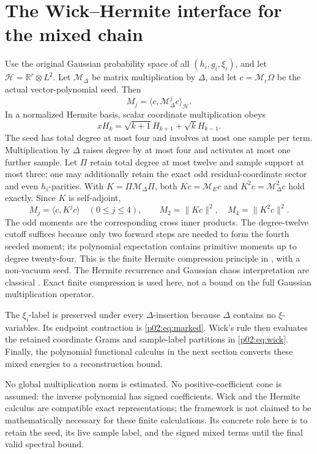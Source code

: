 \documentclass[11pt]{article}
\numberwithin{equation}{section}
\theoremstyle{definition}\newtheorem{definition}[theorem]{Definition}
\theoremstyle{remark}\newtheorem{remark}[theorem]{Remark}
\newcommand{\R}{\mathbb R}\newcommand{\E}{\mathbb E}\newcommand{\Prob}{\mathbb P}
\newcommand{\norm}[1]{\lVert#1\rVert}\newcommand{\ip}[2]{\langle#1,#2\rangle}
\begin{document}
\par{}
\section{The Wick--Hermite interface for the mixed chain}\label{p02:sec:interface}
Use the original Gaussian probability space of all \((h_i,g_i,\xi_i)\), and let \(\mathcal H=\R^r\otimes L^2\). Let \(\mathcal M_\Delta\) be matrix multiplication by \(\Delta\), and let \(c=\mathcal M_c\Omega\) be the actual vector-polynomial seed. Then
\[
 M_j=\langle c,\mathcal M_\Delta^j c\rangle_{\mathcal H}.
\]
In a normalized Hermite basis, scalar coordinate multiplication obeys
\[
 xH_k=\sqrt{k+1}H_{k+1}+\sqrt k H_{k-1}.
\]
The seed has total degree at most four and involves at most one sample per term. Multiplication by \(\Delta\) raises degree by at most four and activates at most one further sample.
Let \(\Pi\) retain total degree at most twelve and sample support at most three; one may additionally retain the exact odd residual-coordinate sector and even \(h_i\)-parities. With
\(K=\Pi\mathcal M_\Delta\Pi\), both \(Kc=\mathcal M_Ec\) and \(K^2c=\mathcal M_\Delta^2c\) hold exactly. Since \(K\) is self-adjoint,
\begin{equation}\label{p02:eq:seeded}
 M_j=\langle c,K^jc\rangle\quad(0\le j\le4),\qquad
 M_2=\norm{Kc}^2,\quad M_4=\norm{K^2c}^2.
\end{equation}
The odd moments are the corresponding cross inner products. The degree-twelve cutoff suffices because only two forward steps are needed to form the fourth seeded moment; its polynomial expectation contains primitive moments up to degree twenty-four. This is the finite Hermite compression principle in \cite{Framework}, with a
non-vacuum seed. The Hermite recurrence and Gaussian chaos interpretation are
classical \cite{Janson}. Exact finite compression is used here, not a bound on
the full Gaussian multiplication operator.

The \(\xi_i\)-label is preserved under every \(\Delta\)-insertion because \(\Delta\) contains no \(\xi\)-variables. Its endpoint contraction is \eqref{p02:eq:marked}. Wick's rule then evaluates the retained coordinate Grams and sample-label partitions in \eqref{p02:eq:wick}. Finally, the polynomial functional calculus in the next section converts these mixed energies to a reconstruction bound.

No global multiplication norm is estimated. No positive-coefficient cone is assumed: the inverse polynomial has signed coefficients. Wick and the Hermite calculus are compatible exact representations; the framework is not claimed to be mathematically necessary for these finite calculations. Its concrete role here is to retain the seed, its live sample label, and the signed mixed terms until the final valid spectral bound.
\end{document}
